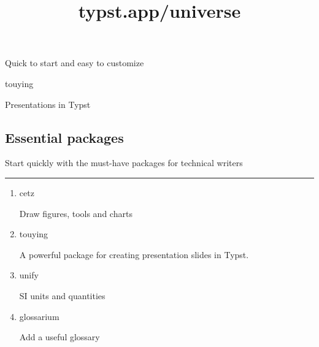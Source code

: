 \title{typst.app/universe}

\href{https://typst.app/universe/package/touying/}{}

Quick to start and easy to customize

touying

Presentations in Typst



\subsection{Essential packages}\label{essential-packages}

Start quickly with the must-have packages for technical writers

\begin{center}\rule{0.5\linewidth}{0.5pt}\end{center}

\begin{enumerate}
\item
  \href{https://typst.app/universe/package/cetz/}{}

  cetz

  Draw figures, tools and charts

  
\item
  \href{https://typst.app/universe/package/touying/}{}

  touying

  A powerful package for creating presentation slides in Typst.

  
\item
  \href{https://typst.app/universe/package/unify/}{}

  unify

  SI units and quantities

  
\item
  \href{https://typst.app/universe/package/glossarium/}{}

  glossarium

  Add a useful glossary

  
\end{enumerate}

